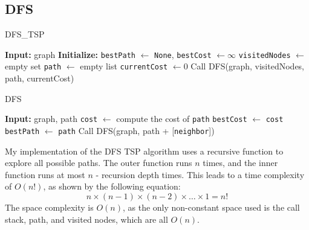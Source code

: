 \documentclass[12pt]{article}
\begin{document}
\newpage

\subsection{DFS}
\begin{algorithm}[H]
    \caption{\textsc{DFS\_TSP}}
    \begin{algorithmic}[1]
        \State \textbf{Input:} graph
        \State \textbf{Initialize:} \texttt{bestPath} $\gets$ \texttt{None}, \texttt{bestCost} $\gets \infty$
        \State \texttt{visitedNodes} $\gets$ empty set
        \State \texttt{path} $\gets$ empty list
        \State \texttt{currentCost} $\gets 0$
        \State Call \textsc{DFS}(graph, visitedNodes, path, currentCost) 
    \end{algorithmic}
\end{algorithm}


\begin{algorithm}[H]
    \caption{\textsc{DFS}}
    \begin{algorithmic}[1]
        \State \textbf{Input:} graph, path
                \State \texttt{cost} $\gets$ compute the cost of \texttt{path}
                    \State \texttt{bestCost} $\gets$ \texttt{cost}
                    \State \texttt{bestPath} $\gets$ \texttt{path}
                \EndIf
            \EndIf
            \State \Return
        \EndIf
         
                \State Call \textsc{DFS}(graph, path + [\texttt{neighbor}]) 
            \EndIf
        \EndFor
    \end{algorithmic}
\end{algorithm}

My implementation of the DFS TSP algorithm uses a recursive function to
explore all possible paths. The outer function runs $n$ times, and the inner
function runs at most $n$ - recursion depth times. This leads to a time complexity of
$O(n!)$, as shown by the following equation:
\[
n \times (n-1) \times (n-2) \times \dots \times 1 = n!
\]
The space complexity is $O(n)$, as the only non-constant space used is the call stack, path,
and visited nodes, which are all $O(n)$.

\newpage
\end{document}
